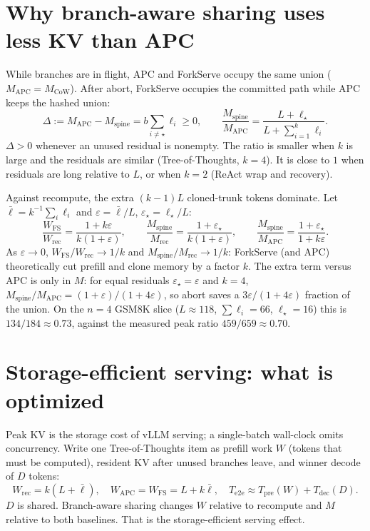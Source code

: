 \documentclass[11pt,a4paper]{article}
\begin{document}
\section{Why branch-aware sharing uses less KV than APC}

While branches are in flight, APC and ForkServe occupy the same union ($M_{\mathrm{APC}}=M_{\mathrm{CoW}}$).
After abort, ForkServe occupies the committed path while APC keeps the hashed union:
\begin{equation}
\label{eq:gap}
\Delta
  := M_{\mathrm{APC}}-M_{\mathrm{spine}}
  = b\sum_{i\neq\star}\ell_i
  \ge 0,
\qquad
\frac{M_{\mathrm{spine}}}{M_{\mathrm{APC}}}
  = \frac{L+\ell_{\star}}{L+\sum_{i=1}^{k}\ell_i}.
\end{equation}
$\Delta>0$ whenever an unused residual is nonempty.
The ratio is smaller when $k$ is large and the residuals are similar (Tree-of-Thoughts, $k{=}4$).
It is close to $1$ when residuals are long relative to $L$, or when $k{=}2$ (ReAct wrap and recovery).

Against recompute, the extra $(k{-}1)L$ cloned-trunk tokens dominate.
Let $\bar\ell=k^{-1}\sum_i\ell_i$ and $\varepsilon=\bar\ell/L$, $\varepsilon_{\star}=\ell_{\star}/L$:
\begin{equation}
\label{eq:ratios}
\frac{W_{\mathrm{FS}}}{W_{\mathrm{rec}}}
  =\frac{1+k\varepsilon}{k(1+\varepsilon)},
\qquad
\frac{M_{\mathrm{spine}}}{M_{\mathrm{rec}}}
  =\frac{1+\varepsilon_{\star}}{k(1+\varepsilon)},
\qquad
\frac{M_{\mathrm{spine}}}{M_{\mathrm{APC}}}
  =\frac{1+\varepsilon_{\star}}{1+k\varepsilon}.
\end{equation}
As $\varepsilon\to 0$, $W_{\mathrm{FS}}/W_{\mathrm{rec}}\to 1/k$ and $M_{\mathrm{spine}}/M_{\mathrm{rec}}\to 1/k$: ForkServe (and APC) theoretically cut prefill and clone memory by a factor $k$.
The extra term versus APC is only in $M$: for equal residuals $\varepsilon_{\star}=\varepsilon$ and $k{=}4$,
$M_{\mathrm{spine}}/M_{\mathrm{APC}}=(1+\varepsilon)/(1+4\varepsilon)$,
so abort saves a $3\varepsilon/(1+4\varepsilon)$ fraction of the union.
On the $n{=}4$ GSM8K slice ($L{\approx}118$, $\sum\ell_i{=}66$, $\ell_{\star}{=}16$) this is $134/184\approx 0.73$, against the measured peak ratio $459/659\approx 0.70$.

\section{Storage-efficient serving: what is optimized}

Peak KV is the storage cost of vLLM serving; a single-batch wall-clock omits concurrency.
Write one Tree-of-Thoughts item as prefill work $W$ (tokens that must be computed), resident KV after unused branches leave, and winner decode of $D$ tokens:
\begin{equation}
\label{eq:sys}
W_{\mathrm{rec}}=k(L+\bar\ell),
\quad
W_{\mathrm{APC}}=W_{\mathrm{FS}}=L+k\bar\ell,
\quad
T_{\mathrm{e2e}}
  \approx T_{\mathrm{pre}}(W)+T_{\mathrm{dec}}(D).
\end{equation}
$D$ is shared. Branch-aware sharing changes $W$ relative to recompute and $M$ relative to both baselines. That is the storage-efficient serving effect.
\end{document}

